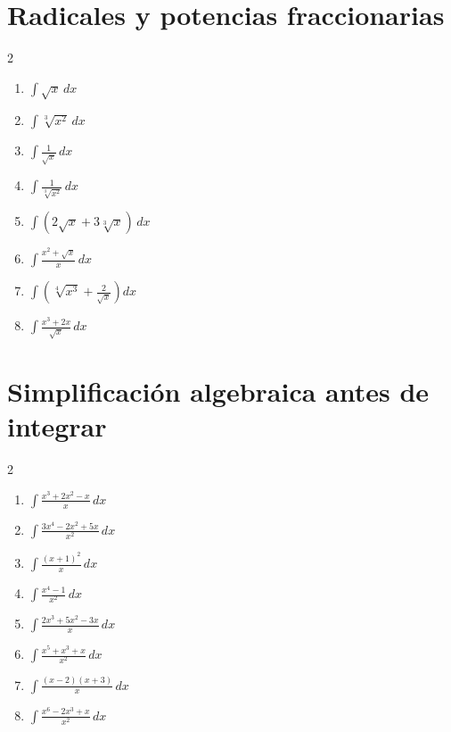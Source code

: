 \documentclass[11pt]{article}
\begin{document}
\section{Radicales y potencias fraccionarias}
\begin{multicols}{2}\begin{enumerate}
\item $\displaystyle \int \sqrt{x}\,dx$
\item $\displaystyle \int \sqrt[3]{x^2}\,dx$
\item $\displaystyle \int \frac{1}{\sqrt{x}}\,dx$
\item $\displaystyle \int \frac{1}{\sqrt[3]{x^2}}\,dx$
\item $\displaystyle \int(2\sqrt{x}+3\sqrt[3]{x})\,dx$
\item $\displaystyle \int\frac{x^2+\sqrt{x}}{x}\,dx$
\item $\displaystyle \int\left(\sqrt[4]{x^3}+\frac{2}{\sqrt{x}}\right)dx$
\item $\displaystyle \int\frac{x^3+2x}{\sqrt{x}}\,dx$
\end{enumerate}\end{multicols}

\section{Simplificación algebraica antes de integrar}
\begin{multicols}{2}\begin{enumerate}
\item $\displaystyle \int\frac{x^3+2x^2-x}{x}\,dx$
\item $\displaystyle \int\frac{3x^4-2x^2+5x}{x^2}\,dx$
\item $\displaystyle \int\frac{(x+1)^2}{x}\,dx$
\item $\displaystyle \int\frac{x^4-1}{x^2}\,dx$
\item $\displaystyle \int\frac{2x^3+5x^2-3x}{x}\,dx$
\item $\displaystyle \int\frac{x^5+x^3+x}{x^2}\,dx$
\item $\displaystyle \int\frac{(x-2)(x+3)}{x}\,dx$
\item $\displaystyle \int\frac{x^6-2x^3+x}{x^2}\,dx$
\end{enumerate}\end{multicols}
\end{document}
